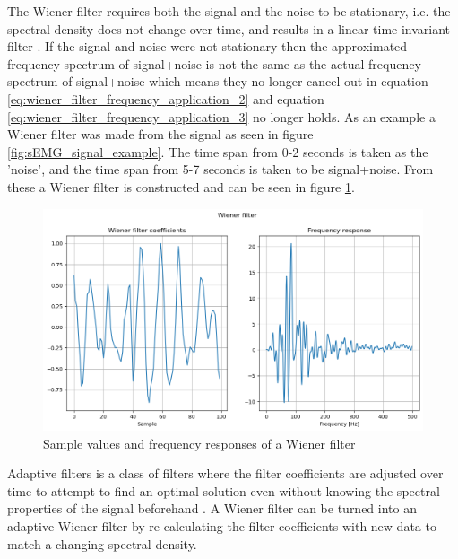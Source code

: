 The Wiener filter requires both the signal and the noise to be stationary, i.e. the spectral density does not change over time, and results in a linear time-invariant filter \cite{stationary_processes_definition} \cite{difference_stationary_nonstationary}. If the signal and noise were not stationary then the approximated frequency spectrum of signal+noise is not the same as the actual frequency spectrum of signal+noise which means they no longer cancel out in equation \ref{eq:wiener_filter_frequency_application_2} and equation \ref{eq:wiener_filter_frequency_application_3} no longer holds.
As an example a Wiener filter was made from the signal as seen in figure \ref{fig:sEMG_signal_example}. The time span from 0-2 seconds is taken as the 'noise', and the time span from 5-7 seconds is taken to be signal+noise. From these a Wiener filter is constructed and can be seen in figure \ref{fig:wiener_filter_response}.

\begin{figure}[h!t]
	\begin{center}
		\includegraphics[width=1.0\columnwidth]{images/wiener_filter_response.png}
	\end{center}
	\caption{Sample values and frequency responses of a Wiener filter}
	\label{fig:wiener_filter_response}
\end{figure}

Adaptive filters is a class of filters where the filter coefficients are adjusted over time to attempt to find an optimal solution even without knowing the spectral properties of the signal beforehand \cite{adaptive_filter_and_applications}. A Wiener filter can be turned into an adaptive Wiener filter by re-calculating the filter coefficients with new data to match a changing spectral density. 

